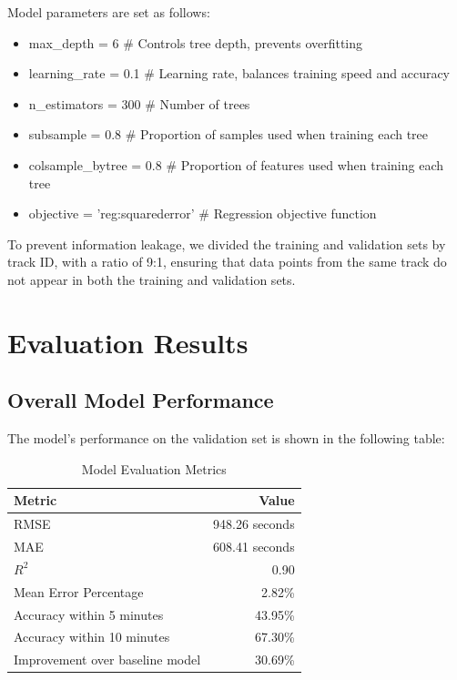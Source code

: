 \documentclass[12pt]{article}
\begin{document}
Model parameters are set as follows:

\begin{itemize}
  \item max\_depth = 6 \hspace{1cm} \# Controls tree depth, prevents overfitting
  \item learning\_rate = 0.1 \hspace{0.6cm} \# Learning rate, balances training speed and accuracy
  \item n\_estimators = 300 \hspace{0.2cm} \# Number of trees
  \item subsample = 0.8 \hspace{0.9cm} \# Proportion of samples used when training each tree
  \item colsample\_bytree = 0.8 \# Proportion of features used when training each tree
  \item objective = 'reg:squarederror' \# Regression objective function
\end{itemize}

To prevent information leakage, we divided the training and validation sets by track ID, with a ratio of 9:1, ensuring that data points from the same track do not appear in both the training and validation sets.

\section{Evaluation Results}

\subsection{Overall Model Performance}

The model's performance on the validation set is shown in the following table:

\begin{table}[H]
\centering
\caption{Model Evaluation Metrics}
\begin{tabular}{lr}
\toprule
Metric & Value \\
\midrule
RMSE & 948.26 seconds \\
MAE  & 608.41 seconds \\
$R^2$ & 0.90 \\
Mean Error Percentage & 2.82\% \\
Accuracy within 5 minutes & 43.95\% \\
Accuracy within 10 minutes & 67.30\% \\
Improvement over baseline model & 30.69\% \\
\bottomrule
\end{tabular}
\end{table}
\end{document}
